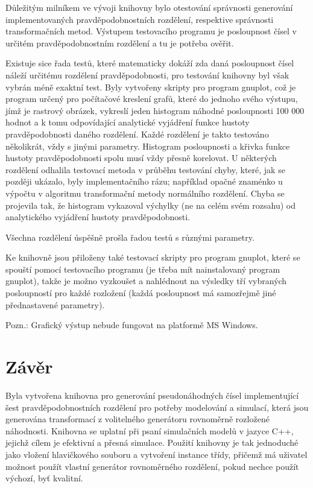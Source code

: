 \documentclass[a4paper,11pt]{article}
\begin{document}
Důležitým milníkem ve vývoji knihovny bylo otestování správnosti generování implementovaných pravděpodobnostních rozdělení, respektive správnosti transformačních metod. Výstupem testovacího programu je posloupnost čísel v určitém pravděpodobnostním rozdělení a tu je potřeba ověřit.

Existuje sice řada testů, které matematicky dokáží zda daná posloupnost čísel náleží určitému rozdělení pravděpodobnosti, pro testování knihovny byl však vybrán méně exaktní test. Byly vytvořeny skripty pro program gnuplot, což je program určený pro počítačové kreslení grafů, které do jednoho svého výstupu, jímž je rastrový obrázek, vykreslí jeden histogram náhodné posloupnosti 100 000 hodnot a k tomu odpovídající analytické vyjádření funkce hustoty pravděpodobnosti daného rozdělení. Každé rozdělení je takto testováno několikrát, vždy s jinými parametry. Histogram posloupnosti a křivka funkce hustoty pravděpodobnosti spolu musí vždy přesně korelovat. U některých rozdělení odhalila testovací metoda v průběhu testování chyby, které, jak se později ukázalo, byly implementačního rázu; například opačné znaménko u výpočtu v algoritmu transformační metody normálního rozdělení. Chyba se projevila tak, že histogram vykazoval výchylky (ne na celém svém rozsahu) od analytického vyjádření hustoty pravděpodobnosti.

Všechna rozdělení úspěšně prošla řadou testů s různými parametry. 

Ke knihovně jsou přiloženy také testovací skripty pro program gnuplot, které se spouští pomocí testovacího programu (je třeba mít nainstalovaný program gnuplot), takže je možno vyzkoušet a nahlédnout na výsledky tří vybraných posloupností pro každé rozložení (každá posloupnost má samozřejmě jiné přednastavené parametry).

Pozn.: Grafický výstup nebude fungovat na platformě MS Windows.

\section{Závěr}
Byla vytvořena knihovna pro generování pseudonáhodných čísel implementující šest pravděpodobnostních rozdělení pro potřeby modelování a simulací, která jsou generována transformací z volitelného generátoru rovnoměrně rozložené náhodnosti. Knihovna se uplatní při psaní simulačních modelů v jazyce C++, jejichž cílem je efektivní a přesná simulace. Použití knihovny je tak jednoduché jako vložení hlavičkového souboru a vytvoření instance třídy, přičemž má uživatel možnost použít vlastní generátor rovnoměrného rozdělení, pokud nechce použít výchozí, byť kvalitní.
\end{document}
